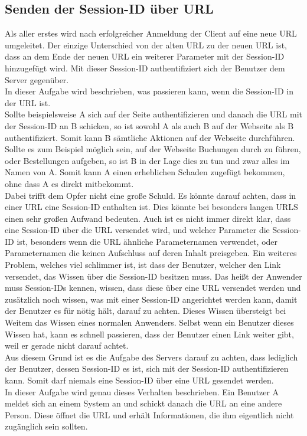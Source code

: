 \subsection{Senden der Session-ID über URL}
Als aller erstes wird nach erfolgreicher Anmeldung der Client auf eine neue URL umgeleitet. Der einzige Unterschied von der alten URL zu der neuen URL ist, dass an dem Ende der neuen URL ein weiterer Parameter mit der Session-ID hinzugefügt wird. Mit dieser Session-ID authentifiziert sich der Benutzer dem Server gegenüber. \\
In dieser Aufgabe wird beschrieben, was passieren kann, wenn die Session-ID in der URL ist. \\
Sollte beispielsweise A sich auf der Seite authentifizieren und danach die URL mit der Session-ID an B schicken, so ist sowohl A als auch B auf der Webseite als B authentifiziert. Somit kann B sämtliche Aktionen auf der Webseite durchführen. Sollte es zum Beispiel möglich sein, auf der Webseite Buchungen durch zu führen, oder Bestellungen aufgeben, so ist B in der Lage dies zu tun und zwar alles im Namen von A. Somit kann A einen erheblichen Schaden zugefügt bekommen, ohne dass A es direkt mitbekommt. \\
Dabei trifft dem Opfer nicht eine große Schuld. Es könnte darauf achten, dass in einer URL eine Session-ID enthalten ist. Dies könnte bei besonders langen URLS einen sehr großen Aufwand bedeuten. Auch ist es nicht immer direkt klar, dass eine Session-ID über die URL versendet wird, und welcher Parameter die Session-ID ist, besonders wenn die URL ähnliche Parameternamen verwendet, oder Parameternamen die keinen Aufschluss auf deren Inhalt preisgeben. Ein weiteres Problem, welches viel schlimmer ist, ist dass der Benutzer, welcher den Link versendet, das Wissen über die Session-ID besitzen muss. Das heißt der Anwender muss Session-IDs kennen, wissen, dass diese über eine URL versendet werden und zusätzlich noch wissen, was mit einer Session-ID angerichtet werden kann, damit der Benutzer es für nötig hält, darauf zu achten. Dieses Wissen übersteigt bei Weitem das Wissen eines normalen Anwenders. Selbst wenn ein Benutzer dieses Wissen hat, kann es schnell passieren, dass der Benutzer einen Link weiter gibt, weil er gerade nicht darauf achtet. \\
Aus diesem Grund ist es die Aufgabe des Servers darauf zu achten, dass lediglich der Benutzer, dessen Session-ID es ist, sich mit der Session-ID authentifizieren kann. Somit darf niemals eine Session-ID über eine URL gesendet werden. \\
In dieser Aufgabe wird genau dieses Verhalten beschrieben. Ein Benutzer A meldet sich an einem System an und schickt danach die URL an eine andere Person. Diese öffnet die URL und erhält Informationen, die ihm eigentlich nicht zugänglich sein sollten.
